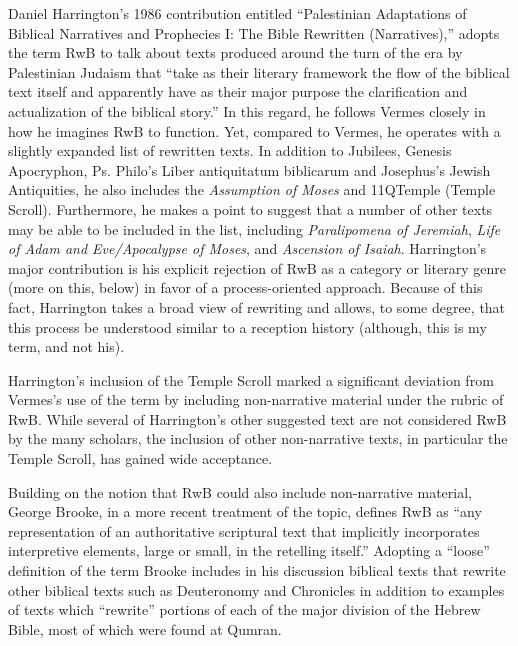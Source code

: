 Daniel Harrington's 1986 contribution entitled ``Palestinian Adaptations
of Biblical Narratives and Prophecies I: The Bible Rewritten
(Narratives),'' adopts the term RwB to talk about texts produced around
the turn of the era by Palestinian Judaism that ``take as their literary
framework the flow of the biblical text itself and apparently have as
their major purpose the clarification and actualization of the biblical
story.''\autocite[239]{harrington_kraft-nickelsburg1986} In this regard,
he follows Vermes closely in how he imagines RwB to function. Yet,
compared to Vermes, he operates with a slightly expanded list of
rewritten texts. In addition to Jubilees, Genesis Apocryphon, Ps.
Philo's Liber antiquitatum biblicarum and Josephus's Jewish Antiquities,
he also includes the \emph{Assumption of Moses} and 11QTemple
(Temple Scroll). Furthermore, he makes a point to suggest that a number
of other texts may be able to be included in the list, including
\emph{Paralipomena of Jeremiah}, \emph{Life of Adam and Eve/Apocalypse
of Moses}, and \emph{Ascension of Isaiah}. Harrington's major
contribution is his explicit rejection of RwB as a category or literary
genre (more on this, below) in favor of a process-oriented approach.
Because of this fact, Harrington takes a broad view of rewriting and
allows, to some degree, that this process be understood similar to a
reception history (although, this is my term, and not his).

Harrington's inclusion of the Temple Scroll marked a significant
deviation from Vermes's use of the term by including non-narrative
material under the rubric of RwB. While several of Harrington's other
suggested text are not considered RwB by the many scholars, the
inclusion of other non-narrative texts, in particular the Temple Scroll,
has gained wide acceptance.\autocite{bernstein_textus2005}

Building on the notion that RwB could also include non-narrative
material, George Brooke, in a more recent treatment of the topic,
defines RwB as ``any representation of an authoritative scriptural text
that implicitly incorporates interpretive elements, large or small, in
the retelling itself.''\autocite[777]{brooke_schiffman-vanderkam2000}
Adopting a ``loose'' definition of the term Brooke includes in his
discussion biblical texts that rewrite other biblical texts such as
Deuteronomy and Chronicles in addition to examples of texts which
``rewrite'' portions of each of the major division of the Hebrew Bible,
most of which were found at Qumran.\autocites[Brooke categorizes the
texts as follows: Reworked Pentateuchs, Rewritten Pentateuchal
narratives, Rewritten Pentateuchal laws, Rewritten Former Prophets,
Rewritten Latter Prophets, and Rewritten
Writings.][778--780]{brooke_schiffman-vanderkam2000}[See
also][]{brooke_herbert-tov2002}

